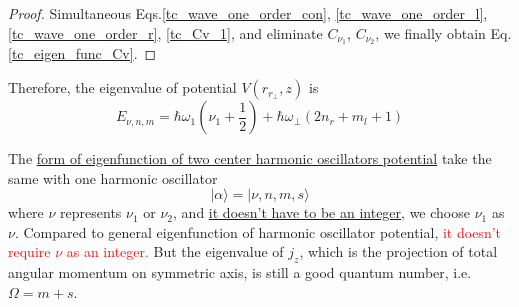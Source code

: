 \begin{proof}
    Simultaneous Eqs.\eqref{tc_wave_one_order_con}, \eqref{tc_wave_one_order_l}, \eqref{tc_wave_one_order_r}, \eqref{tc_Cv_1}, and eliminate $C_{\nu_1}$, $C_{\nu_2}$, we finally obtain Eq.\eqref{tc_eigen_func_Cv}.
  \end{proof}
  Therefore, the eigenvalue of potential $V(r_{r_\perp}, z)$ is 
  \begin{equation}
    E_{\nu, n, m} = \hbar\omega_1(\nu_1 + \frac{1}{2}) + \hbar\omega_\perp (2n_r + m_l +1)
  \end{equation}


  The \underline{form of eigenfunction of two center harmonic oscillators potential} take the same with one harmonic oscillator
  \begin{equation}
    | \alpha \rangle = | \nu, n, m, s \rangle
  \end{equation}
  where $\nu$ represents $\nu_1$ or $\nu_2$, and \underline{it doesn't have to be an integer}, we choose $\nu_1$ as $\nu$. Compared to general eigenfunction of harmonic oscillator potential, \textcolor{red}{it doesn't require $\nu$ as an integer.} But the eigenvalue of $j_z$, which is the projection of total angular momentum on symmetric axis, is still a good quantum number, i.e. $\Omega = m + s$.

